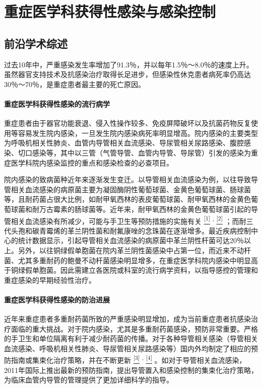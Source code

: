 \chapter{重症医学科获得性感染与感染控制}

\section{前沿学术综述}

过去10年中，严重感染发生率增加了91.3％，并以每年1.5％～8.0％的速度上升。虽然器官支持技术及抗感染治疗取得长足进步，但感染性休克患者病死率仍高达30％～70％，是重症患者最主要的死亡原因。

\subsubsection{重症医学科获得性感染的流行病学}

重症患者由于器官功能衰退、侵入性操作较多、免疫屏障破坏以及抗菌药物反复使用等容易发生院内感染，一旦发生院内感染病死率明显增高。院内感染的主要类型为呼吸机相关性肺炎、血管内导管相关血流感染、导尿管相关尿路感染、腹腔感染、切口感染等，其中以三管（气管导管、血管内导管、导尿管）引发的感染为重症医学科院内感染监控的重点和感染检查的必查项目。

院内感染的致病菌种近年来逐渐发生变迁。以导管相关血流感染为例，以往导致导管相关血流感染的病原菌主要为凝固酶阴性葡萄球菌、金黄色葡萄球菌、肠球菌等，且耐药菌占很大比例，如耐甲氧西林的表皮葡萄球菌、耐甲氧西林的金黄色葡萄球菌和耐万古霉素的肠球菌等。近年来，耐甲氧西林的金黄色葡萄球菌引起的导管相关血流感染有所减少，可能与手卫生等预防措施的实施有关
\protect\hyperlink{text00031.htmlux5cux23ch1-30}{\textsuperscript{{[}1{]}}}
\textsuperscript{,}
\protect\hyperlink{text00031.htmlux5cux23ch2-30}{\textsuperscript{{[}2{]}}}
；而耐三代头孢和碳青霉烯的革兰阴性菌和耐氟康唑的念珠菌在逐渐增多。最近疾病控制中心的统计数据显示，引起导管相关血流感染的病原菌中革兰阴性杆菌可达20％以上。另外，以往铜绿假单胞菌在院内革兰阴性菌感染中占第一位，而近来不动杆菌、尤其多重耐药的鲍曼不动杆菌感染明显增多，在重症医学科院内感染中明显高于铜绿假单胞菌。因此需建立各医院或科室的流行病学资料，以指导感控的管理和重症感染的早期经验性治疗。

\subsubsection{重症医学科获得性感染的防治进展}

近年来重症患者多重耐药菌所致的严重感染明显增加，成为当前重症患者抗感染治疗面临的重大挑战。对于院内感染，尤其是多重耐药菌感染，预防非常重要。严格的手卫生和单位隔离有利于减少耐药菌的传播。对于各种导管相关感染（导管相关血流感染、呼吸机相关性肺炎、导尿管相关尿路感染等）国内外均制定了相应的预防指南或集束化治疗策略，并在不断更新
\protect\hyperlink{text00031.htmlux5cux23ch3-30}{\textsuperscript{{[}3{]}}}
\textsuperscript{,}
\protect\hyperlink{text00031.htmlux5cux23ch4-30}{\textsuperscript{{[}4{]}}}
。如对于导管相关血流感染，2011年国际上推出最新的预防指南，提出导管置入和感染控制的集束化治疗策略，为临床血管内导管的管理提供了更加详细科学的指导。

